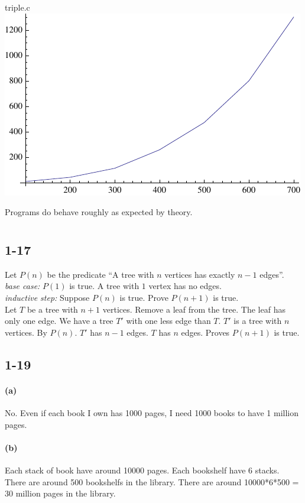 \documentclass[letter]{article}
\begin{document}
triple.c\\
\includegraphics[scale=1]{triple,pdf.pdf}

Programs do behave roughly as expected by theory.

\newpage
\section{}
\subsection*{1-17}
Let $P(n)$ be the predicate ``A tree with $n$ vertices has exactly $n-1$ edges''.\\
\emph{base case:} $P(1)$ is true. A tree with $1$ vertex has no edges.\\
\emph{inductive step:} Suppose $P(n)$ is true. Prove $P(n+1)$ is true.\\
Let $T$ be a tree with $n+1$ vertices. Remove a leaf from the tree. The leaf has only one edge. We have a tree $T'$ with one less edge than $T$. $T'$ is a tree with $n$ vertices. By $P(n)$. $T'$ has $n-1$ edges. $T$ has $n$ edges. Proves $P(n+1)$ is true.

\subsection*{1-19}
\paragraph*{(a)}
No. Even if each book I own has 1000 pages, I need 1000 books to have 1 million pages.
\paragraph*{(b)}
Each stack of book have around 10000 pages. Each bookshelf have 6 stacks. There are around 500 bookshelfs in the library. There are around 10000*6*500 = 30 million pages in the library.
\end{document}
